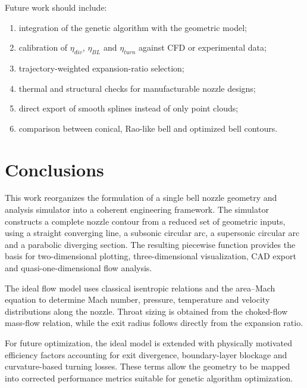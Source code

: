 \documentclass[journal,article,submit,oneauthor]{Definitions/mdpi}
\begin{document}
Future work should include:
\begin{enumerate}
    \item integration of the genetic algorithm with the geometric model;
    \item calibration of $\eta_{div}$, $\eta_{BL}$ and $\eta_{turn}$ against CFD or experimental data;
    \item trajectory-weighted expansion-ratio selection;
    \item thermal and structural checks for manufacturable nozzle designs;
    \item direct export of smooth splines instead of only point clouds;
    \item comparison between conical, Rao-like bell and optimized bell contours.
\end{enumerate}

\section{Conclusions}

This work reorganizes the formulation of a single bell nozzle geometry and analysis simulator into a coherent engineering framework. The simulator constructs a complete nozzle contour from a reduced set of geometric inputs, using a straight converging line, a subsonic circular arc, a supersonic circular arc and a parabolic diverging section. The resulting piecewise function provides the basis for two-dimensional plotting, three-dimensional visualization, CAD export and quasi-one-dimensional flow analysis.

The ideal flow model uses classical isentropic relations and the area--Mach equation to determine Mach number, pressure, temperature and velocity distributions along the nozzle. Throat sizing is obtained from the choked-flow mass-flow relation, while the exit radius follows directly from the expansion ratio.

For future optimization, the ideal model is extended with physically motivated efficiency factors accounting for exit divergence, boundary-layer blockage and curvature-based turning losses. These terms allow the geometry to be mapped into corrected performance metrics suitable for genetic algorithm optimization.
\end{document}

